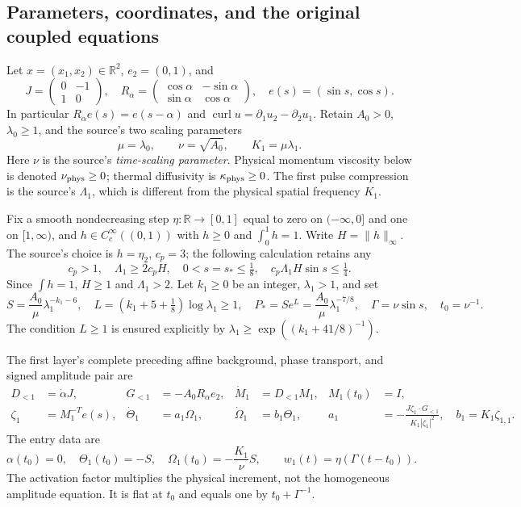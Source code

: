 \subsection{Parameters, coordinates, and the original coupled equations}

Let $x=(x_1,x_2)\in\mathbb R^2$, $e_2=(0,1)$, and
\[
 J=\begin{pmatrix}0&-1\\1&0\end{pmatrix},\quad
 R_\alpha=\begin{pmatrix}\cos\alpha&-\sin\alpha\\
 \sin\alpha&\cos\alpha\end{pmatrix},\quad
 e(s)=(\sin s,\cos s).
\]
In particular $R_\alpha e(s)=e(s-\alpha)$ and
$\operatorname{curl}u=\partial_1u_2-\partial_2u_1$.
Retain $A_0>0$, $\lambda_0\geq1$, and the source's two scaling parameters
\[
 \mu=\lambda_0,\qquad \nu=\sqrt{A_0},\qquad K_1=\mu\lambda_1.
\]
Here $\nu$ is the source's \emph{time-scaling parameter}.
Physical momentum viscosity below is denoted $\nu_{\rm phys}\geq0$;
thermal diffusivity is $\kappa_{\rm phys}\geq0$.
The first pulse compression is the source's $\Lambda_1$, which is
different from the physical spatial frequency $K_1$.

Fix a smooth nondecreasing step $\eta:\mathbb R\to[0,1]$ equal to zero
on $(-\infty,0]$ and one on $[1,\infty)$, and
$h\in C_c^\infty((0,1))$ with $h\geq0$ and $\int_0^1h=1$.
Write $H=\|h\|_\infty$. The source's choice is $h=\eta_2$,
$c_p=3$; the following calculation retains any
\begin{equation}
 c_p>1,\quad \Lambda_1\geq2c_pH,\quad
 0<s=s_*\leq\tfrac18,\quad c_p\Lambda_1H\sin s\leq\tfrac14.
 \label{cvlane:eq:cv-first-design}
\end{equation}
Since $\int h=1$, $H\geq1$ and $\Lambda_1>2$.
Let $k_1\geq0$ be an integer, $\lambda_1>1$, and set
\begin{equation}
 S=\frac{A_0}{\mu}\lambda_1^{-k_1-6},\quad
 L=(k_1+5+\tfrac18)\log\lambda_1\geq1,\quad
 P_* =S e^L=\frac{A_0}{\mu}\lambda_1^{-7/8},\quad
 \Gamma=\nu\sin s,\quad t_0=\nu^{-1}.
 \label{cvlane:eq:cv-first-seed}
\end{equation}
The condition $L\geq1$ is ensured explicitly by
$\lambda_1\geq\exp((k_1+41/8)^{-1})$.

The first layer's complete preceding affine background, phase transport,
and signed amplitude pair are
\begin{align}
 D_{<1}&=\dot\alpha J,&G_{<1}&=-A_0R_\alpha e_2,
 &\dot M_1&=D_{<1}M_1,&M_1(t_0)&=I,\label{cvlane:eq:cv-first-background}\\
 \zeta_1&=M_1^{-T}e(s),&
 \dot\Theta_1&=a_1\Omega_1,&
 \dot\Omega_1&=b_1\Theta_1,&
 a_1&=-\frac{J\zeta_1\cdot G_{<1}}{K_1|\zeta_1|^2},\quad
 b_1=K_1\zeta_{1,1}.\label{cvlane:eq:cv-first-pair}
\end{align}
The entry data are
\[
 \alpha(t_0)=0,\quad \Theta_1(t_0)=-S,\quad
 \Omega_1(t_0)=-\frac{K_1}{\nu}S,
 \qquad w_1(t)=\eta(\Gamma(t-t_0)).
\]
The activation factor multiplies the physical increment, not the
homogeneous amplitude equation. It is flat at $t_0$ and equals one
by $t_0+\Gamma^{-1}$.

